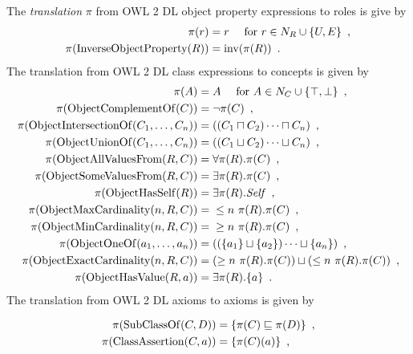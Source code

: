 \begin{definition} \label{def:owl2sroiq}
  The \emph{translation} $\pi$ from OWL 2 DL object property expressions to \SROIQ roles is give by
  \begin{align*}
    \pi(r) &= r \quad \text{ for } r \in N_R \cup \{ U, E \} \enspace, \\
    \pi(\operatorname{InverseObjectProperty}(R)) &= \operatorname{inv}(\pi(R)) \enspace.
  \end{align*}
  The translation from OWL 2 DL class expressions to \SROIQ concepts is given by
  \begin{align*}
    \pi(A) &= A \quad \text{ for } A \in N_C \cup \{ \top, \bot \} \enspace, \\
    \pi(\operatorname{ObjectComplementOf}(C)) &= \lnot \pi(C) \enspace, \\
    \pi(\operatorname{ObjectIntersectionOf}(C_1, \dots, C_n)) &= ((C_1 \sqcap C_2) \cdots \sqcap C_n) \enspace, \\
    \pi(\operatorname{ObjectUnionOf}(C_1, \dots, C_n)) &= ((C_1 \sqcup C_2) \cdots \sqcup C_n) \enspace, \\
    \pi(\operatorname{ObjectAllValuesFrom}(R, C)) &= \forall \pi(R).\pi(C) \enspace, \\
    \pi(\operatorname{ObjectSomeValuesFrom}(R, C)) &= \exists \pi(R).\pi(C) \enspace, \\
    \pi(\operatorname{ObjectHasSelf}(R)) &= \exists \pi(R).\mathit{Self} \enspace, \\
    \pi(\operatorname{ObjectMaxCardinality}(n, R, C)) &={} \leq n~\pi(R).\pi(C) \enspace, \\
    \pi(\operatorname{ObjectMinCardinality}(n, R, C)) &={} \geq n~\pi(R).\pi(C) \enspace, \\
    \pi(\operatorname{ObjectOneOf}(a_1, \dots, a_n)) &= ((\{a_1\} \sqcup \{a_2\}) \cdots \sqcup \{a_n\}) \enspace, \\
    \pi(\operatorname{ObjectExactCardinality}(n, R, C)) &= (\geq n~\pi(R).\pi(C)) \sqcup (\leq n~\pi(R).\pi(C)) \enspace, \\
    \pi(\operatorname{ObjectHasValue}(R, a)) &= \exists \pi(R).\{a\} \enspace.
  \end{align*}
  The translation from OWL 2 DL axioms to \SROIQ axioms is given by
  \begin{widepage}
    \small
    \begin{align*}
      \pi(\op{SubClassOf}(C, D)) ={} & \{ \pi(C) \sqsubseteq \pi(D) \} \enspace, \\
      \pi(\op{ClassAssertion}(C, a)) ={} & \{ \pi(C)(a) \} \enspace, \\

\end{align*}
\end{widepage}
\end{definition}
